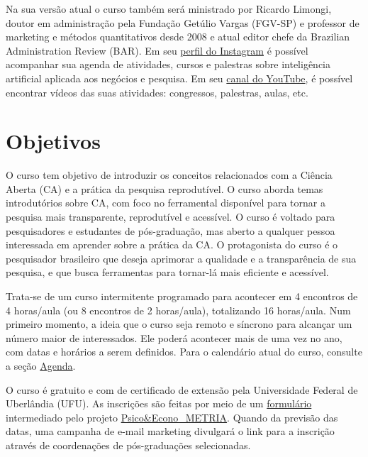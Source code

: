 \documentclass[
  a4paper,
]{book}
\begin{document}
Na sua versão atual o curso também será ministrado por Ricardo Limongi,
doutor em administração pela Fundação Getúlio Vargas (FGV-SP) e
professor de marketing e métodos quantitativos desde 2008 e atual editor
chefe da Brazilian Administration Review (BAR). Em seu
\href{https://www.instagram.com/limongi/}{perfil do Instagram} é
possível acompanhar sua agenda de atividades, cursos e palestras sobre
inteligência artificial aplicada aos negócios e pesquisa. Em seu
\href{https://www.youtube.com/@ricardolimongi_ia}{canal do YouTube}, é
possível encontrar vídeos das suas atividades: congressos, palestras,
aulas, etc.

\section*{Objetivos}\label{sec-about}


O curso tem objetivo de introduzir os conceitos relacionados com a
Ciência Aberta (CA) e a prática da pesquisa reprodutível. O curso aborda
temas introdutórios sobre CA, com foco no ferramental disponível para
tornar a pesquisa mais transparente, reprodutível e acessível. O curso é
voltado para pesquisadores e estudantes de pós-graduação, mas aberto a
qualquer pessoa interessada em aprender sobre a prática da CA. O
protagonista do curso é o pesquisador brasileiro que deseja aprimorar a
qualidade e a transparência de sua pesquisa, e que busca ferramentas
para tornar-lá mais eficiente e acessível.

Trata-se de um curso intermitente programado para acontecer em 4
encontros de 4 horas/aula (ou 8 encontros de 2 horas/aula), totalizando
16 horas/aula. Num primeiro momento, a ideia que o curso seja remoto e
síncrono para alcançar um número maior de interessados. Ele poderá
acontecer mais de uma vez no ano, com datas e horários a serem
definidos. Para o calendário atual do curso, consulte a seção
\href{https://phdpablo.github.io/curso-open-science/00-schedule.html}{Agenda}.

O curso é gratuito e com de certificado de extensão pela Universidade
Federal de Uberlândia (UFU). As inscrições são feitas por meio de um
\href{https://forms.gle/wRNWAU9Ffyp7o4Vq9}{formulário} intermediado pelo
projeto
\href{https://www.youtube.com/c/PsicoEconoMETRIA}{Psico\&Econo\_METRIA}.
Quando da previsão das datas, uma campanha de e-mail marketing divulgará
o link para a inscrição através de coordenações de pós-graduações
selecionadas.
\end{document}
